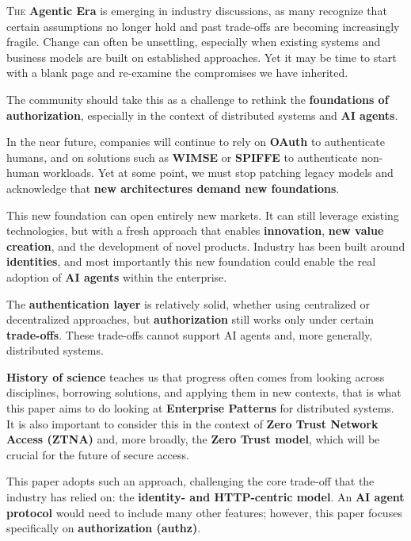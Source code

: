\lettrine{T}{he} \textbf{Agentic Era} is emerging in industry discussions, as many recognize that certain assumptions no longer hold and past trade-offs are becoming increasingly fragile.  
Change can often be unsettling, especially when existing systems and business models are built on established approaches. 
Yet it may be time to start with a blank page and re-examine the compromises we have inherited.

\vspace{0.5em} The community should take this as a challenge to rethink the \textbf{foundations of authorization}, especially in the context of distributed systems and \textbf{AI agents}.

\vspace{0.5em} In the near future, companies will continue to rely on \textbf{OAuth} to authenticate humans, and on solutions such as \textbf{WIMSE} or \textbf{SPIFFE} to authenticate non-human workloads.  
Yet at some point, we must stop patching legacy models and acknowledge that \textbf{new architectures demand new foundations}.

\vspace{0.5em} This new foundation can open entirely new markets. 
It can still leverage existing technologies, but with a fresh approach that enables \textbf{innovation}, \textbf{new value creation}, and the development of novel products.  
Industry has been built around \textbf{identities}, and most importantly this new foundation could enable the real adoption of \textbf{AI agents} within the enterprise.

\vspace{0.5em} The \textbf{authentication layer} is relatively solid, whether using centralized or decentralized approaches, but \textbf{authorization} still works only under certain \textbf{trade-offs}.  
These trade-offs cannot support AI agents and, more generally, distributed systems. 

\vspace{0.5em} \textbf{History of science} teaches us that progress often comes from looking across disciplines, borrowing solutions, and applying them in new contexts, that is what this paper aims to do looking at \textbf{Enterprise Patterns} for distributed systems.  
It is also important to consider this in the context of \textbf{Zero Trust Network Access (ZTNA)} and, more broadly, the \textbf{Zero Trust model}, which will be crucial for the future of secure access.

\vspace{0.5em} This paper adopts such an approach, challenging the core trade-off that the industry has relied on: the \textbf{identity- and HTTP-centric model}.  
An \textbf{AI agent protocol} would need to include many other features; however, this paper focuses specifically on \textbf{authorization (authz)}.

